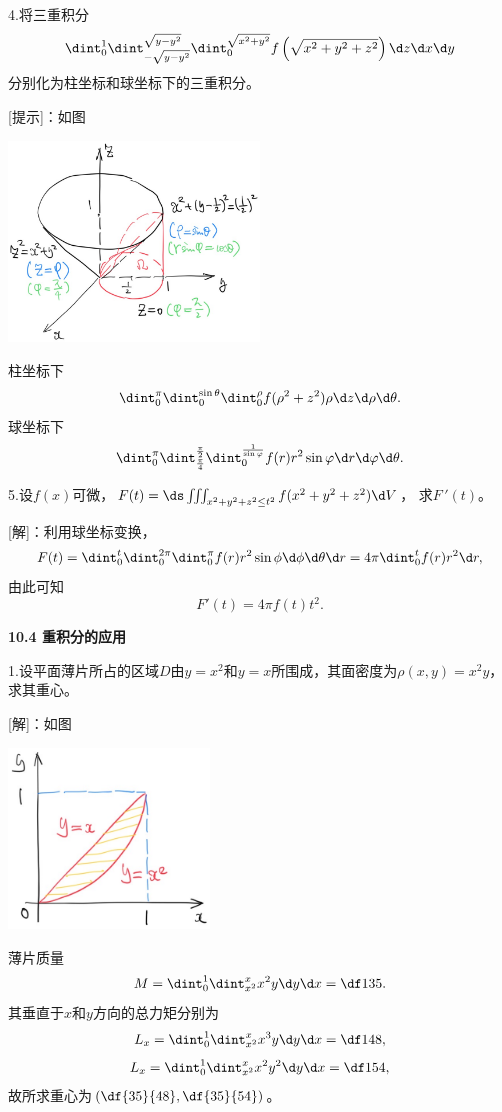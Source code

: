\bs

4.将三重积分
$$\dint_0^1\dint_{-\sqrt{y-y^2}}^{\sqrt{y-y^2}}
\dint_0^{\sqrt{x^2+y^2}}f\left(
\sqrt{x^2+y^2+z^2}\right)\d z\d x\d y$$
分别化为柱坐标和球坐标下的三重积分。

[提示]：如图
\begin{center}
	\includegraphics[width=0.5\textwidth]{./images/ch10/dxyz.jpg}
\end{center}
柱坐标下
$$\dint_0^{\pi}\dint_0^{\sin\theta}\dint_0^{\rho}
f(\rho^2+z^2)\rho\d z\d\rho\d\theta.$$
球坐标下
$$\dint_0^{\pi}\dint_{\frac{\pi}{4}}^{\frac{\pi}{2}}\dint_0^{\frac1{\sin\varphi}}
f(r)r^2\sin\varphi\d r\d\varphi\d\theta.$$
\fin

\bs

5.设$f(x)$可微，$F(t)=\ds\iiint_{x^2+y^2+z^2\leq t^2}f(x^2+y^2+z^2)\d V$，
求$F\,'(t)$。

[解]：利用球坐标变换，
$$F(t)=\dint_0^t\dint_0^{2\pi}\dint_0^{\pi}f(r)r^2\sin\phi\d\phi\d\theta\d r
=4\pi\dint_0^tf(r)r^2\d r,$$
由此可知
$$F'(t)=4\pi f(t)t^2.$$
\fin

\bs

\begin{center}
	\bf 10.4 重积分的应用
\end{center}

1.设平面薄片所占的区域$D$由$y=x^2$和$y=x$所围成，其面密度为$\rho(x,y)
=x^2y$，求其重心。

[解]：如图
\begin{center}
	\includegraphics[width=0.4\textwidth]{./images/ch10/10.4.1.jpg}
\end{center}
薄片质量
$$M=\dint_0^1\dint_{x^2}^xx^2y\d y\d x=\df1{35}.$$
其垂直于$x$和$y$方向的总力矩分别为
$$L_x=\dint_0^1\dint_{x^2}^xx^3y\d y\d x=\df1{48},$$
$$L_x=\dint_0^1\dint_{x^2}^xx^2y^2\d y\d x=\df1{54},$$
故所求重心为$\left(\df{35}{48},\df{35}{54}\right)$。\fin

